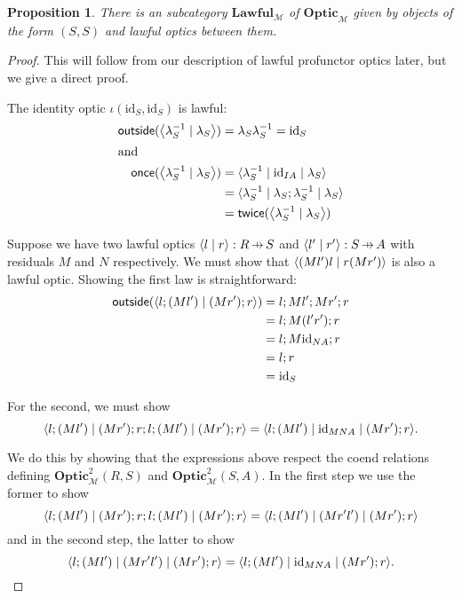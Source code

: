 \documentclass[11pt,letterpaper]{article}
\theoremstyle{plain}
\newtheorem{proposition}[theorem]{Proposition}
\theoremstyle{definition}
\newcommand{\M}{\mathscr{M}}
\newcommand{\Optic}{\mathbf{Optic}}
\newcommand{\Twoptic}{\mathbf{Optic}^2}
\newcommand{\Lawful}{\mathbf{Lawful}}
\newcommand{\id}{\mathrm{id}}
\newcommand{\rep}[2]{{\ensuremath \left\langle #1 \mid #2 \right\rangle}}
\newcommand{\repthree}[3]{{\ensuremath \langle #1 \mid #2 \mid #3 \rangle}}
\newcommand{\outside}{\mathsf{outside}}
\newcommand{\once}{\mathsf{once}}
\newcommand{\twice}{\mathsf{twice}}
\newcommand{\hto}{\ensuremath{\,\mathaccent\shortmid\rightarrow\,}}
\begin{document}
\begin{proposition}\label{prop:lawful-category}
  There is an subcategory $\Lawful_\M$ of $\Optic_\M$ given by objects of the form $(S, S)$ and lawful optics between them.
\end{proposition}
\begin{proof}
  This will follow from our description of lawful profunctor optics later, but we give a direct proof.

  The identity optic $\iota(\id_S, \id_S)$ is lawful:
  \begin{align*}
    \outside(\rep{\lambda^{-1}_S}{\lambda_{S}}) &= \lambda_{S} \lambda^{-1}_S = \id_S \\
    \intertext{and}
    \once(\rep{\lambda^{-1}_S}{\lambda_{S}})
                                                          &= \repthree{\lambda^{-1}_S}{\id_{IA}}{\lambda_{S}} \\
                                                          &= \repthree{\lambda^{-1}_S}{\lambda_{S};\lambda^{-1}_S}{\lambda_{S}} \\
                                                          &= \twice(\rep{\lambda^{-1}_S}{\lambda_{S}})
  \end{align*}

  Suppose we have two lawful optics $\rep{l}{r} : R \hto S$ and $\rep{l'}{r'} : S \hto A$ with residuals $M$ and $N$ respectively. We must show that $\rep{(Ml')l}{r (Mr')}$ is also a lawful optic. Showing the first law is straightforward:
  \begin{align*}
    \outside(\rep{l; (Ml')}{(Mr') ; r})
    &= l ; Ml' ; Mr' ; r \\
    &= l ; M(l'r') ; r \\
    &= l ; M\id_{NA} ; r \\
    &= l ; r \\
    &= \id_S
  \end{align*}

  For the second, we must show
  \[ \repthree{ l;(Ml')}{(Mr'); r;l;(Ml')}{(Mr') ; r} = \repthree{l;(Ml')}{\id_{MNA}}{(Mr') ; r}. \]

  We do this by showing that the expressions above respect the coend relations defining $\Twoptic_\M(R, S)$ and $\Twoptic_\M(S, A)$. In the first step we use the former to show
  \[ \repthree{ l;(Ml')}{(Mr'); r;l;(Ml')}{(Mr') ; r} = \repthree{l;(Ml')}{(Mr'l')}{(Mr') ; r} \]
  and in the second step, the latter to show
  \[ \repthree{ l;(Ml')}{(Mr'l')}{(Mr') ; r} = \repthree{l;(Ml')}{\id_{MNA}}{(Mr') ; r}. \]


\end{proof}
\end{document}
